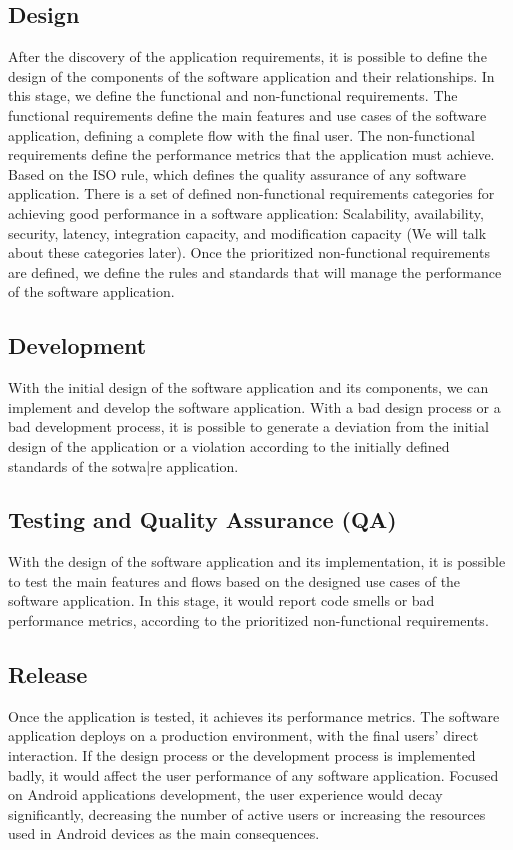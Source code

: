 \subsection{Design}
After the discovery of the application requirements, it is possible to define the design of the components of the software application and their relationships. In this stage, we define the functional and non-functional requirements. The functional requirements define the main features and use cases of the software application, defining a complete flow with the final user. The non-functional requirements define the performance metrics that the application must achieve. Based on the ISO rule, which defines the quality assurance of any software application. There is a set of defined non-functional requirements categories for achieving good performance in a software application: Scalability, availability, security, latency, integration capacity, and modification capacity (We will talk about these categories later). Once the prioritized non-functional requirements are defined, we define the rules and standards that will manage the performance of the software application.

\subsection{Development}
With the initial design of the software application and its components, we can implement and develop the software application. With a bad design process or a bad development process, it is possible to generate a deviation from the initial design of the application or a violation according to the initially defined standards of the sotwa|re application.

\subsection{Testing and Quality Assurance (QA)}
With the design of the software application and its implementation, it is possible to test the main features and flows based on the designed use cases of the software application. In this stage, it would report code smells or bad performance metrics, according to the prioritized non-functional requirements.

\subsection{Release}
Once the application is tested, it achieves its performance metrics. The software application deploys on a production environment, with the final users' direct interaction. If the design process or the development process is implemented badly, it would affect the user performance of any software application. Focused on Android applications development, the user experience would decay significantly, decreasing the number of active users or increasing the resources used in Android devices as the main consequences.

